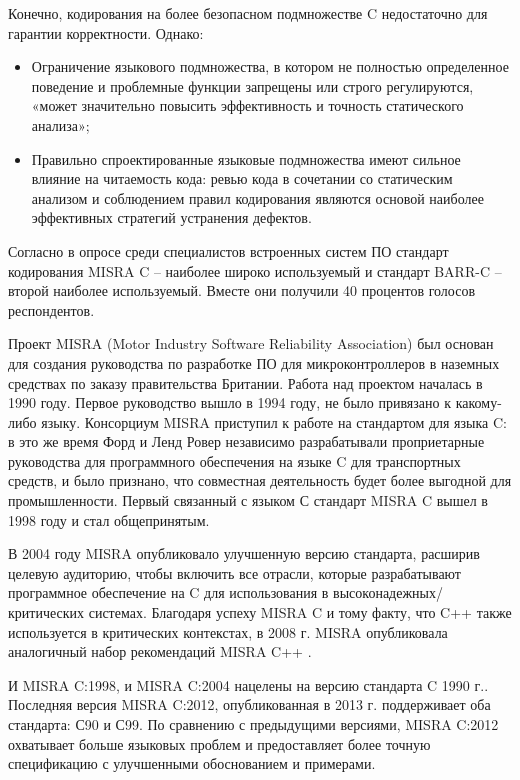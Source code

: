 Конечно, кодирования на более безопасном подмножестве C недостаточно для гарантии корректности. Однако:

\begin{itemize}
    \item Ограничение языкового подмножества, в котором не полностью определенное поведение и 
    проблемные функции запрещены или строго регулируются, «может значительно повысить эффективность и  
    точность статического анализа»\cite{astreeConf};
    \item Правильно спроектированные языковые подмножества имеют сильное влияние на читаемость кода:
    ревью кода в сочетании со статическим анализом и соблюдением правил кодирования являются основой 
    наиболее эффективных стратегий устранения дефектов.  
\end{itemize}

Согласно\cite{bagnara2020barrc2018} в опросе среди специалистов встроенных систем ПО  стандарт кодирования MISRA C\cite{Misrac1998} -- наиболее широко 
используемый и стандарт BARR-C\cite{barrc} -- второй наиболее используемый. Вместе они получили 40 процентов голосов респондентов.  

Проект MISRA (Motor Industry Software Reliability Association) был основан для создания руководства по разработке ПО для микроконтроллеров в 
наземных средствах по заказу правительства Британии. Работа над проектом началась в 1990 году.  Первое руководство вышло в 1994 году, не 
было привязано к какому-либо языку. Консорциум MISRA приступил к работе на стандартом для языка C: в это же время Форд и Ленд Ровер независимо разрабатывали проприетарные 
руководства для программного обеспечения на языке C для транспортных средств, и было признано, что совместная 
деятельность будет более выгодной для промышленности. Первый связанный с языком С стандарт MISRA C\cite{Misrac1998} вышел в 1998 году и стал общепринятым. 

В 2004 году MISRA опубликовало улучшенную версию стандарта\cite{Misrac2004}, расширив целевую аудиторию, 
чтобы включить все отрасли, которые разрабатывают программное обеспечение на C для использования в 
высоконадежных/критических системах. Благодаря успеху MISRA C и тому факту, что C++ также используется в 
критических контекстах, в 2008 г. MISRA опубликовала аналогичный набор рекомендаций MISRA C++
\cite{Misrac2008}.

И MISRA C:1998, и MISRA C:2004 нацелены на версию стандарта C 1990 г.\cite{ISOIEC99899in1990}. Последняя 
версия MISRA C:2012, опубликованная в 2013 г.\cite{Misrac2012} поддерживает оба стандарта: С90 и 
С99\cite{ISOIEC99899in1999}. По сравнению с предыдущими версиями, MISRA C:2012 охватывает больше языковых 
проблем и предоставляет более точную спецификацию с улучшенными обоснованием и примерами.

